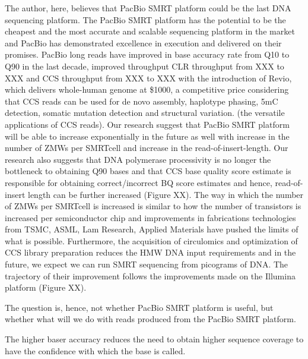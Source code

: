 The author, here, believes that PacBio SMRT platform could be the last DNA sequencing platform. The PacBio SMRT platform has the potential to be the cheapest and the most accurate and scalable sequencing platform in the market and PacBio has demonstrated excellence in execution and delivered on their promises. PacBio long reads have improved in base accuracy rate from Q10 to Q90 in the last decade, improved throughput CLR throughput from XXX to XXX and CCS throughput from XXX to XXX with the introduction of Revio, which delivers whole-human genome at \$1000, a competitive price considering that CCS reads can be used for de novo assembly, haplotype phasing, 5mC detection, somatic mutation detection and structural variation. (the versatile applications of CCS reads). Our research suggest that PacBio SMRT platform will be able to increase exponentially in the future as well with increase in the number of ZMWs per SMRTcell and increase in the read-of-insert-length. Our research also suggests that DNA polymerase processivity is no longer the bottleneck to obtaining Q90 bases and that CCS base quality score estimate is responsible for obtaining correct/incorrect BQ score estimates and hence, read-of-insert length can be further increased (Figure XX). The way in which the number of ZMWs per SMRTcell is increased is similar to how the number of transistors is increased per semiconductor chip and improvements in fabrications technologies from TSMC, ASML, Lam Research, Applied Materials have pushed the limits of what is possible. Furthermore, the acquisition of circulomics and optimization of CCS library preparation reduces the HMW DNA input requirements and in the future, we expect we can run SMRT sequencing from picograms of DNA. The trajectory of their improvement follows the improvements made on the Illumina platform (Figure XX). 

The question is, hence, not whether PacBio SMRT platform is useful, but whether what will we do with reads produced from the PacBio SMRT platform. 

The higher baser accuracy reduces the need to obtain higher sequence coverage to have the confidence with which the base is called. 

